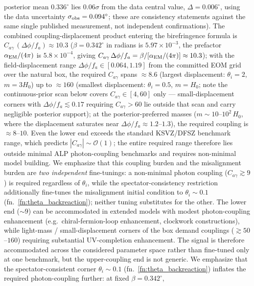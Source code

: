 \documentclass[aps,prd,twocolumn,superscriptaddress,showpacs,preprintnumbers,nofootinbib,longbibliography,floatfix]{revtex4-2}
\begin{document}
posterior mean $0.336^\circ$ lies $0.06\sigma$ from the data central value,
$\Delta=0.006^\circ$, using the data uncertainty $\sigma_{\rm obs}=0.094^\circ$;
these are consistency statements against the same single
published measurement, not independent confirmations). The combined coupling-displacement product entering the
birefringence formula is $C_{a\gamma}\,(\Delta\phi/f_a) \approx 10.3$
($\beta = 0.342^\circ$ in radians is $5.97\times 10^{-3}$, the prefactor
$\alpha_{\rm EM}/(4\pi)$ is $5.8\times 10^{-4}$, giving
$C_{a\gamma}\,\Delta\phi/f_a = \beta/[\alpha_{\rm EM}/(4\pi)] \approx 10.3$);
with the field-displacement range $\Delta\phi/f_a \in [0.064, 1.19]$ from the
committed EOM grid over the natural box, the required $C_{a\gamma}$ spans
${\approx}8.6$ (largest displacement: $\theta_i=2$, $m=3H_0$) up to
${\approx}160$ (smallest displacement: $\theta_i=0.5$, $m=H_0$; note the
continuous-prior scan below covers $C_{a\gamma}\in[4,60]$ only ---
small-displacement corners with $\Delta\phi/f_a \lesssim 0.17$ requiring
$C_{a\gamma}>60$ lie outside that scan and carry negligible posterior
support); at the
posterior-preferred masses ($m\sim 10$--$10^2\,H_0$, where the displacement
saturates near $\Delta\phi/f_a\approx 1.2$--$1.3$), the required coupling
is ${\approx}8$--$10$. Even the lower end exceeds the standard KSVZ/DFSZ
benchmark range, which predicts $|C_{a\gamma}|\sim\mathcal{O}(1)$; the
entire required range therefore lies outside minimal ALP photon-coupling
benchmarks and requires non-minimal model building. We emphasize that
this coupling burden and the misalignment burden are \emph{two
independent} fine-tunings: a non-minimal photon coupling
($C_{a\gamma}\gtrsim 9$) is required regardless of $\theta_i$, while the
spectator-consistency restriction additionally fine-tunes the
misalignment initial condition to $\theta_i\sim 0.1$
(fn.~\ref{fn:theta_backreaction}); neither tuning substitutes for the
other. The lower end
($\sim 9$) can be accommodated in extended models with modest
photon-coupling enhancement (e.g.\ chiral-fermion-loop enhancement,
clockwork constructions), while light-mass / small-displacement corners
of the box demand couplings ($\gtrsim 50$--$160$) requiring substantial
UV-completion enhancement. The signal is therefore accommodated
across the considered parameter space rather than fine-tuned only at one
benchmark, but the upper-coupling end is not generic. We emphasize that the
spectator-consistent corner $\theta_i\sim 0.1$ (fn.~\ref{fn:theta_backreaction})
inflates the required photon-coupling further: at fixed $\beta=0.342^\circ$,
\end{document}
